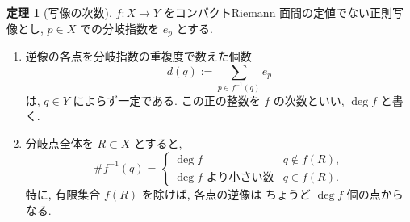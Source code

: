 \documentclass[dvipdfmx,a4paper,11pt]{article} %
\theoremstyle{definition}
\newtheorem{thm}{定理}[section]
\numberwithin{equation}{section}
\begin{document}
\begin{thm}[写像の次数]\label{O-M071}
$f:X\to Y$ をコンパクトRiemann 面間の定値でない正則写像とし, 
$p\in X$ での分岐指数を $e_p$ とする.
\begin{enumerate}
\item 逆像の各点を分岐指数の重複度で数えた個数
\[
d(q):=\sum_{p\in f^{-1}(q)}e_p
\]
は, $q\in Y$ によらず一定である.
この正の整数を $f$ の次数といい, $\deg f$ と書く.

\item 分岐点全体を $R\subset X$ とすると, 
\[
\#f^{-1}(q)=
\begin{cases}
\deg f & q\notin f(R),\\
\deg f\text{ より小さい数} & q\in f(R).
\end{cases}
\]
特に, 有限集合 $f(R)$ を除けば, 各点の逆像は
ちょうど $\deg f$ 個の点からなる.
\end{enumerate}
\end{thm}
\end{document}
